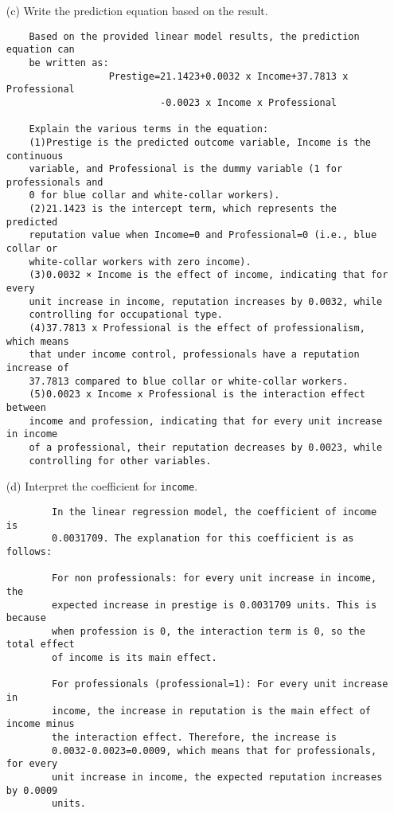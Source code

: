 \documentclass[12pt,letterpaper]{article}
\begin{document}
\begin{enumerate}
	\vspace{6cm}
	\item [(c)]
	Write the prediction equation based on the result.
	\begin{verbatim}
	Based on the provided linear model results, the prediction equation can 
	be written as: 
	              Prestige=21.1423+0.0032 x Income+37.7813 x Professional 
	                       -0.0023 x Income x Professional
	
	Explain the various terms in the equation:
	(1)Prestige is the predicted outcome variable, Income is the continuous 
	variable, and Professional is the dummy variable (1 for professionals and 
	0 for blue collar and white-collar workers).
	(2)21.1423 is the intercept term, which represents the predicted 
	reputation value when Income=0 and Professional=0 (i.e., blue collar or 
	white-collar workers with zero income).
	(3)0.0032 × Income is the effect of income, indicating that for every 
	unit increase in income, reputation increases by 0.0032, while 
	controlling for occupational type.
	(4)37.7813 x Professional is the effect of professionalism, which means 
	that under income control, professionals have a reputation increase of 
	37.7813 compared to blue collar or white-collar workers.
	(5)0.0023 x Income x Professional is the interaction effect between 
	income and profession, indicating that for every unit increase in income 
	of a professional, their reputation decreases by 0.0023, while 
	controlling for other variables.
	\end{verbatim}
\newpage
	\item [(d)]
	Interpret the coefficient for \texttt{income}.
	\begin{verbatim}
		In the linear regression model, the coefficient of income is 
		0.0031709. The explanation for this coefficient is as follows:
		
		For non professionals: for every unit increase in income, the 
		expected increase in prestige is 0.0031709 units. This is because 
		when profession is 0, the interaction term is 0, so the total effect 
		of income is its main effect.
		
		For professionals (professional=1): For every unit increase in 
		income, the increase in reputation is the main effect of income minus 
		the interaction effect. Therefore, the increase is 
		0.0032-0.0023=0.0009, which means that for professionals, for every 
		unit increase in income, the expected reputation increases by 0.0009 
		units.
		

\end{verbatim}
\end{enumerate}
\end{document}
